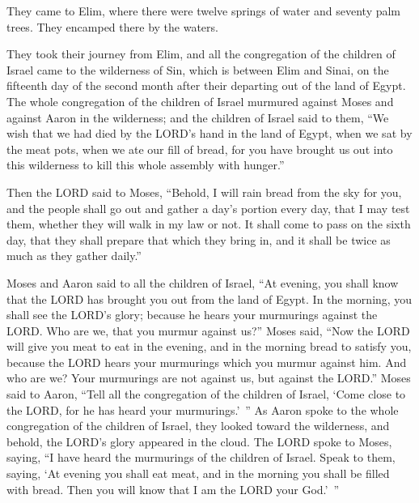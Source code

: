 \myverse{}They came to Elim, where there were twelve springs of water
and seventy palm trees. They encamped there by the waters.


\mychapter{} \myverse*{}They took their journey from Elim, and all the congregation of
the children of Israel came to the wilderness of Sin, which is between Elim and Sinai, on the fifteenth
day of the second month after their departing out of the land of Egypt.
\myverse{}The whole congregation of the children of Israel murmured against Moses and
against Aaron in the wilderness;
\myverse{}and the children of Israel said to them, “We wish that we had died by the LORD’s
hand in the land of Egypt, when we sat by the meat pots, when we ate our fill of bread, for you have brought
us out into this wilderness to kill this whole assembly with hunger.”


\myverse{}Then the LORD said to Moses, “Behold, I will rain bread from the
sky for you, and the people shall go out and gather a day’s portion every day, that I may test them, whether
they will walk in my law or not.
\myverse{}It shall come to pass on the sixth day, that they shall prepare that which
they bring in, and it shall be twice as much as they gather daily.”


\myverse{}Moses and Aaron said to all the children of Israel, “At evening,
you shall know that the LORD has brought you out from the land of Egypt.
\myverse{}In the morning, you shall see the LORD’s glory; because he hears your murmurings
against the LORD. Who are we, that you murmur against us?”
\myverse{}Moses said, “Now the LORD will give you meat to eat in the evening, and in
the morning bread to satisfy you, because the LORD hears your murmurings which you murmur against him.
And who are we? Your murmurings are not against us, but against the LORD.”
\myverse{}Moses said to Aaron, “Tell all the congregation of the children of Israel,
‘Come close to the LORD, for he has heard your murmurings.’ ”
\myverse{}As Aaron spoke to the whole congregation of the children of Israel, they
looked toward the wilderness, and behold, the LORD’s glory appeared in the cloud.
\myverse{}The LORD spoke to Moses, saying,
\myverse{}“I have heard the murmurings of the children of Israel. Speak to them, saying,
‘At evening you shall eat meat, and in the morning you shall be filled with bread. Then you will know
that I am the LORD your God.’ ”


